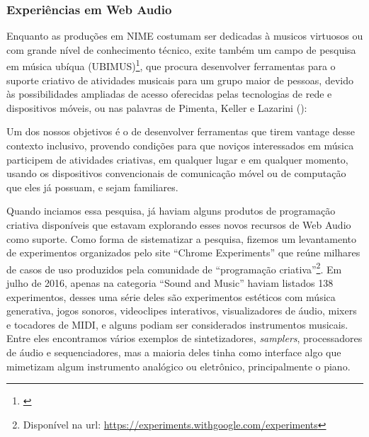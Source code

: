 \subsubsection{Experiências em Web Audio}
Enquanto as produções em NIME costumam ser dedicadas à musicos virtuosos ou com grande nível de conhecimento técnico, exite também um campo de pesquisa em música ubíqua (UBIMUS)\footnote{\cite{Keller}}, que procura desenvolver ferramentas para o suporte criativo de atividades musicais para um grupo maior de pessoas, devido às possibilidades ampliadas de acesso oferecidas pelas tecnologias de rede e dispositivos móveis, ou nas palavras de Pimenta, Keller e Lazarini (\citeyear{Keller}):

\begin{citacao}
Um dos nossos objetivos é o de desenvolver ferramentas que tirem vantage desse contexto inclusivo, provendo condições para que noviços interessados em música participem de atividades criativas, em qualquer lugar e em qualquer momento, usando os dispositivos convencionais de comunicação móvel ou de computação que eles já possuam, e sejam familiares. \cite[p. 13]{Keller}

\end{citacao}


Quando inciamos essa pesquisa, já haviam alguns produtos de programação criativa disponíveis que estavam explorando esses novos recursos de Web Audio como suporte. Como forma de sistematizar a pesquisa, fizemos um levantamento de experimentos organizados pelo site ``Chrome Experiments'' que reúne milhares de casos de uso produzidos pela comunidade de ``programação criativa''\footnote{Disponível na url: \url{https://experiments.withgoogle.com/experiments}}. Em julho de 2016, apenas na categoria ``Sound and Music''  haviam listados 138 experimentos, desses uma série deles são experimentos estéticos com música generativa, jogos sonoros, videoclipes interativos, visualizadores de áudio, mixers e tocadores de MIDI, e alguns podiam ser considerados instrumentos musicais. Entre eles encontramos vários exemplos de sintetizadores, \emph{samplers}, processadores de áudio e sequenciadores, mas a maioria deles tinha como interface algo que mimetizam algum instrumento analógico ou eletrônico, principalmente o piano.

